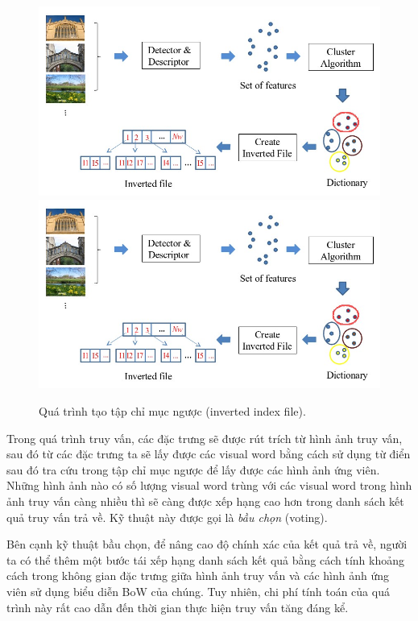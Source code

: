 \begin{figure}[!htbp]
  \begin{center}
    \leavevmode
    \ifpdf
      \includegraphics[scale=0.51]{invertedFile}
    \else
      \includegraphics[scale=0.51]{invertedFile}
    \fi
    \caption[Quá trình tạo tập chỉ mục ngược]{Quá trình tạo tập chỉ mục ngược (inverted index file).}
    \label{FigInvertedFile}
  \end{center}
\end{figure}

Trong quá trình truy vấn, các đặc trưng sẽ được rút trích từ hình ảnh truy vấn, sau đó từ các đặc trưng ta sẽ lấy được các visual word bằng cách sử dụng từ điển sau đó tra cứu trong tập chỉ mục ngược để lấy được các hình ảnh ứng viên. Những hình ảnh nào có số lượng visual word trùng với các visual word trong hình ảnh truy vấn càng nhiều thì sẽ càng được xếp hạng cao hơn trong danh sách kết quả truy vấn trả về. Kỹ thuật này được gọi là \textit{bầu chọn} (voting).

Bên cạnh kỹ thuật bầu chọn, để nâng cao độ chính xác của kết quả trả về, người ta có thể thêm một bước tái xếp hạng danh sách kết quả bằng cách tính khoảng cách trong không gian đặc trưng giữa hình ảnh truy vấn và các hình ảnh ứng viên sử dụng biểu diễn BoW của chúng. Tuy nhiên, chi phí tính toán của quá trình này rất cao dẫn đến thời gian thực hiện truy vấn tăng đáng kể.\\

